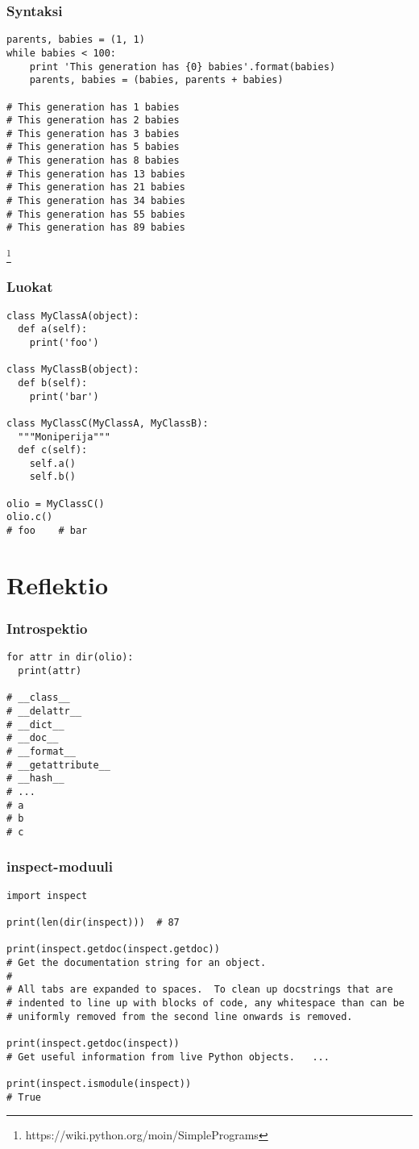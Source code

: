 \documentclass{beamer}
\newcommand\blfootnote[1]{%
  \begingroup
  \renewcommand\thefootnote{}\footnote{#1}%
  \addtocounter{footnote}{-1}%
  \endgroup
}
\begin{document}
\begin{frame}[fragile]
\frametitle{Syntaksi}
\begin{verbatim}
parents, babies = (1, 1)
while babies < 100:
    print 'This generation has {0} babies'.format(babies)
    parents, babies = (babies, parents + babies)

# This generation has 1 babies
# This generation has 2 babies
# This generation has 3 babies
# This generation has 5 babies
# This generation has 8 babies
# This generation has 13 babies
# This generation has 21 babies
# This generation has 34 babies
# This generation has 55 babies
# This generation has 89 babies
\end{verbatim}
\blfootnote{https://wiki.python.org/moin/SimplePrograms}
\end{frame}


\begin{frame}[fragile]
\frametitle{Luokat}
\begin{verbatim}
class MyClassA(object):
  def a(self):
    print('foo')

class MyClassB(object):
  def b(self):
    print('bar')

class MyClassC(MyClassA, MyClassB):
  """Moniperija"""
  def c(self):
    self.a()
    self.b()

olio = MyClassC()
olio.c()
# foo    # bar
\end{verbatim}
\end{frame}

\section{Reflektio}

\begin{frame}[fragile]
\frametitle{Introspektio}
\begin{verbatim}
for attr in dir(olio): 
  print(attr)

# __class__
# __delattr__
# __dict__
# __doc__
# __format__
# __getattribute__
# __hash__
# ...
# a
# b
# c
\end{verbatim}
\end{frame}

\begin{frame}[fragile]
\frametitle{inspect-moduuli}
\begin{verbatim}
import inspect

print(len(dir(inspect)))  # 87

print(inspect.getdoc(inspect.getdoc))
# Get the documentation string for an object.
# 
# All tabs are expanded to spaces.  To clean up docstrings that are
# indented to line up with blocks of code, any whitespace than can be
# uniformly removed from the second line onwards is removed.

print(inspect.getdoc(inspect))
# Get useful information from live Python objects.   ...

print(inspect.ismodule(inspect))
# True

\end{verbatim}
\end{frame}
\end{document}
